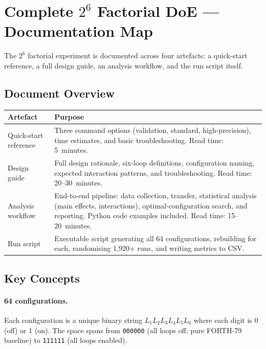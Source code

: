 
\section{Complete $2^6$ Factorial DoE — Documentation Map}
\label{sec:factorial-doe-index}

The $2^6$ factorial experiment is documented across four artefacts: a quick-start
reference, a full design guide, an analysis workflow, and the run script itself.

\subsection{Document Overview}

\begin{center}
\begin{tabular}{lp{8cm}}
\toprule
Artefact & Purpose \\
\midrule
Quick-start reference & Three command options (validation, standard, high-precision),
  time estimates, and basic troubleshooting. Read time: 5~minutes. \\
Design guide & Full design rationale, six-loop definitions, configuration
  naming, expected interaction patterns, and troubleshooting. Read time:
  20--30~minutes. \\
Analysis workflow & End-to-end pipeline: data collection, transfer, statistical
  analysis (main effects, interactions), optimal-configuration search, and
  reporting. Python code examples included. Read time: 15--20~minutes. \\
Run script & Executable script generating all 64 configurations, rebuilding
  for each, randomising 1{,}920+ runs, and writing metrics to CSV. \\
\bottomrule
\end{tabular}
\end{center}

\subsection{Key Concepts}

\paragraph{64 configurations.}
Each configuration is a unique binary string $L_1 L_2 L_3 L_4 L_5 L_6$ where
each digit is 0 (off) or 1 (on). The space spans from \texttt{000000} (all loops
off; pure FORTH-79 baseline) to \texttt{111111} (all loops enabled).

